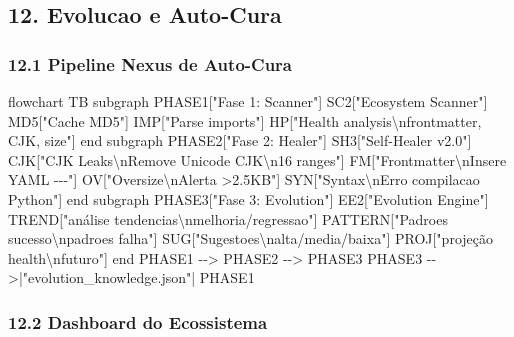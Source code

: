 \documentclass[
  12pt,
]{article}
\newenvironment{Shaded}{}{}
\newcommand{\NormalTok}[1]{#1}
\begin{document}
\subsection{12. Evolucao e Auto-Cura}\label{evolucao-e-auto-cura}

\subsubsection{12.1 Pipeline Nexus de
Auto-Cura}\label{pipeline-nexus-de-auto-cura}

\begin{Shaded}
\begin{Highlighting}[]
\NormalTok{flowchart TB}
\NormalTok{subgraph PHASE1["Fase 1: Scanner"]}
\NormalTok{SC2["Ecosystem Scanner"]}
\NormalTok{MD5["Cache MD5"]}
\NormalTok{IMP["Parse imports"]}
\NormalTok{HP["Health analysis\textbackslash{}nfrontmatter, CJK, size"]}
\NormalTok{end}
\NormalTok{subgraph PHASE2["Fase 2: Healer"]}
\NormalTok{SH3["Self{-}Healer v2.0"]}
\NormalTok{CJK["CJK Leaks\textbackslash{}nRemove Unicode CJK\textbackslash{}n16 ranges"]}
\NormalTok{FM["Frontmatter\textbackslash{}nInsere YAML {-}{-}{-}"]}
\NormalTok{OV["Oversize\textbackslash{}nAlerta \textgreater{}2.5KB"]}
\NormalTok{SYN["Syntax\textbackslash{}nErro compilacao Python"]}
\NormalTok{end}
\NormalTok{subgraph PHASE3["Fase 3: Evolution"]}
\NormalTok{EE2["Evolution Engine"]}
\NormalTok{TREND["análise tendencias\textbackslash{}nmelhoria/regressao"]}
\NormalTok{PATTERN["Padroes sucesso\textbackslash{}npadroes falha"]}
\NormalTok{SUG["Sugestoes\textbackslash{}nalta/media/baixa"]}
\NormalTok{PROJ["projeção health\textbackslash{}nfuturo"]}
\NormalTok{end}
\NormalTok{PHASE1 {-}{-}\textgreater{} PHASE2 {-}{-}\textgreater{} PHASE3}
\NormalTok{PHASE3 {-}{-}\textgreater{}|"evolution\_knowledge.json"| PHASE1}
\end{Highlighting}
\end{Shaded}

\subsubsection{12.2 Dashboard do
Ecossistema}\label{dashboard-do-ecossistema}
\end{document}
